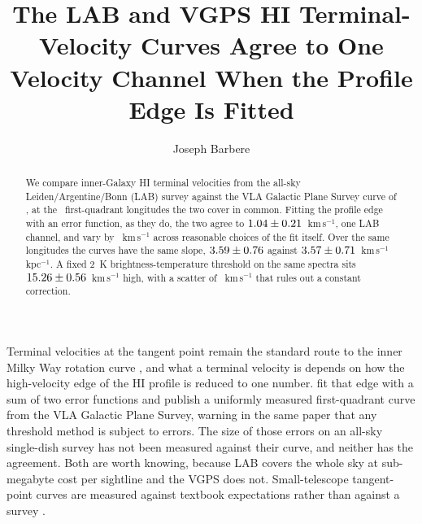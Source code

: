 \documentclass[RNAAS]{aastex631}
\begin{document}
\title{The LAB and VGPS HI Terminal-Velocity Curves Agree to One Velocity Channel When the
Profile Edge Is Fitted}

\author[0009-0008-3289-4447]{Joseph Barbere}

\begin{abstract}
We compare inner-Galaxy HI terminal velocities from the all-sky Leiden/Argentine/Bonn (LAB)
survey against the VLA Galactic Plane Survey curve of \citet{mccluregriffiths2016}, at the
\hiRealRefN\ first-quadrant longitudes the two cover in common. Fitting the profile edge with an
error function, as they do, the two agree to
$1.04\pm0.21$~km\,s$^{-1}$, one LAB channel, and vary
by \hiRealEstSysSpan~km\,s$^{-1}$ across reasonable choices of the fit itself. Over the same
longitudes the curves have the same slope, $3.59\pm0.76$ against
$3.57\pm0.71$~km\,s$^{-1}$\,kpc$^{-1}$. A fixed 2~K
brightness-temperature threshold on the same spectra sits
$15.26\pm0.56$~km\,s$^{-1}$ high, with a scatter of
\hiRealRefThrOffsetSd~km\,s$^{-1}$ that rules out a constant correction.
\end{abstract}

\section{}

Terminal velocities at the tangent point remain the standard route to the inner Milky Way
rotation curve \citep{mccluregriffiths2007}, and what a terminal velocity is depends on how the
high-velocity edge of the HI profile is reduced to one number. \citet{mccluregriffiths2016} fit
that edge with a sum of two error functions and publish a uniformly measured first-quadrant
curve from the VLA Galactic Plane Survey, warning in the same paper that any threshold method is
subject to errors. The size of those errors on an all-sky single-dish survey has not been
measured against their curve, and neither has the agreement. Both are worth knowing, because LAB
\citep{kalberla2005} covers the whole sky at sub-megabyte cost per sightline and the VGPS does
not. Small-telescope tangent-point curves are measured against textbook expectations rather than
against a survey \citep{lihu2024}.
\end{document}
